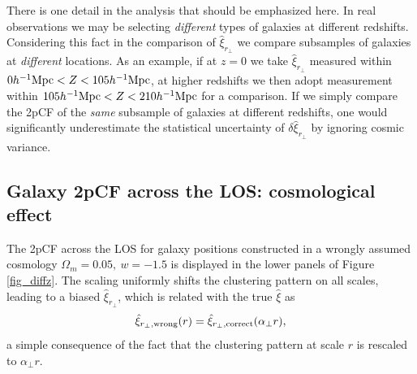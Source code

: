 \documentclass[iop]{emulateapj}
\begin{document}
There is one detail in the analysis that should be emphasized here.
In real observations we may be selecting {\it different} types of galaxies at different redshifts.
Considering this fact in the comparison of $\hat\xi_{r_\perp}$ 
we compare subsamples of galaxies at {\it different} locations.
As an example, if at $z=0$ we take $\hat\xi_{r_\perp}$ measured within $0h^{-1}{\rm Mpc}<Z<105 h^{-1}{\rm Mpc}$,
at higher redshifts we then adopt measurement within $105h^{-1}{\rm Mpc}<Z<210 h^{-1}{\rm Mpc}$ for a comparison.
If we simply compare the 2pCF of the {\it same} subsample of galaxies at different redshifts, 
one would significantly underestimate the statistical uncertainty of $\delta \hat{\xi}_{r_\perp}$ by ignoring cosmic variance.




\subsection{Galaxy 2pCF across the LOS: cosmological effect }

The 2pCF across the LOS for galaxy positions constructed in a wrongly assumed cosmology $\Omega_m=0.05,\ w=-1.5$
is displayed in the lower panels of Figure \ref{fig_diffz}.
The scaling uniformly shifts the clustering pattern on all scales, 
leading to a biased $\hat \xi_{r_\perp}$, which is 
related with the true $\hat \xi$ as
\begin{equation}
 \hat \xi_{r_\perp,\rm wrong}(r) = \hat \xi_{r_\perp, \rm correct}(\alpha_{\perp} r),
\end{equation}
a simple consequence of the fact that the clustering pattern at scale $r$ is rescaled to $\alpha_{\perp} r$.
\end{document}
